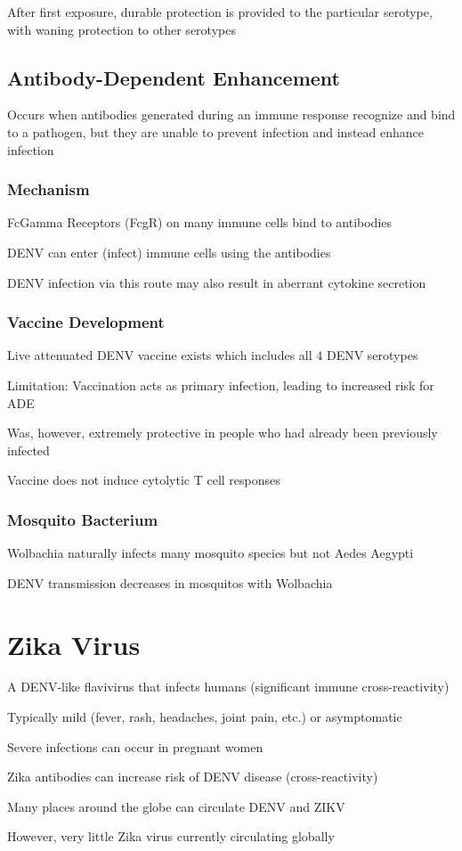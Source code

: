 \documentclass{notes}
\begin{document}
After first exposure, durable protection is provided to the particular serotype, with waning protection to other serotypes

\subsection{Antibody-Dependent Enhancement}

Occurs when antibodies generated during an immune response recognize and bind to a pathogen, but they are unable to prevent infection and instead enhance infection

\subsubsection{Mechanism}

FcGamma Receptors (FcgR) on many immune cells bind to antibodies

\tab DENV can enter (infect) immune cells using the antibodies

\tab DENV infection via this route may also result in aberrant cytokine secretion

\subsubsection{Vaccine Development}

Live attenuated DENV vaccine exists which includes all 4 DENV serotypes

Limitation: Vaccination acts as primary infection, leading to increased risk for ADE

\tab Was, however, extremely protective in people who had already been previously infected

Vaccine does not induce cytolytic T cell responses

\subsubsection{Mosquito Bacterium}

Wolbachia naturally infects many mosquito species but not Aedes Aegypti

\tab DENV transmission decreases in mosquitos with Wolbachia

\section{Zika Virus}

A DENV-like flavivirus that infects humans (significant immune cross-reactivity)

Typically mild (fever, rash, headaches, joint pain, etc.) or asymptomatic

Severe infections can occur in pregnant women


Zika antibodies can increase risk of DENV disease (cross-reactivity)

Many places around the globe can circulate DENV and ZIKV

\tab However, very little Zika virus currently circulating globally
\end{document}
